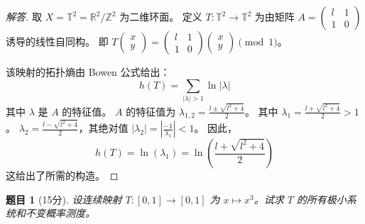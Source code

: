 \documentclass[a4paper,12pt]{article}
\newtheorem{problem}{题目}
\newenvironment{solution}{\begin{proof}[解答]}{\end{proof}}
\begin{document}
\begin{solution}
    取 $X = \mathbb{T}^2 = \mathbb{R}^2/\mathbb{Z}^2$ 为二维环面。
    定义 $T: \mathbb{T}^2 \to \mathbb{T}^2$ 为由矩阵 $A = \begin{pmatrix} l & 1 \\ 1 & 0 \end{pmatrix}$ 诱导的线性自同构。
    即 $T\begin{pmatrix} x \\ y \end{pmatrix} = \begin{pmatrix} l & 1 \\ 1 & 0 \end{pmatrix} \begin{pmatrix} x \\ y \end{pmatrix} \pmod 1$。
    
    该映射的拓扑熵由 Bowen 公式给出：
    $$
    h(T) = \sum_{|\lambda| > 1} \ln |\lambda|
    $$
    其中 $\lambda$ 是 $A$ 的特征值。
    $A$ 的特征值为 $\lambda_{1,2} = \frac{l \pm \sqrt{l^2+4}}{2}$。
    其中 $\lambda_1 = \frac{l + \sqrt{l^2+4}}{2} > 1$。
    $\lambda_2 = \frac{l - \sqrt{l^2+4}}{2}$，其绝对值 $|\lambda_2| = |\frac{-1}{\lambda_1}| < 1$。
    因此，
    $$
    h(T) = \ln(\lambda_1) = \ln\left(\frac{l + \sqrt{l^2+4}}{2}\right)
    $$
    这给出了所需的构造。
\end{solution}

\begin{problem}[15分]
    设连续映射 $T: [0, 1] \to [0, 1]$ 为 $x \mapsto x^3$。试求 $T$ 的所有极小系统和不变概率测度。
\end{problem}
\end{document}
